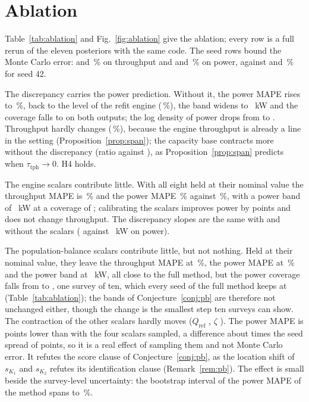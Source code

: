 \documentclass[journal]{IEEEtran}
\newcommand{\pct}{\,\%}
\begin{document}
\section{Ablation}\label{sec:ablation}

Table~\ref{tab:ablation} and Fig.~\ref{fig:ablation} give the ablation; every row is a full rerun of the eleven posteriors with
the same code. The seed rows bound the Monte Carlo error: \abSeedBTphMape{} and \abSeedCTphMape\pct{} on throughput and
\abSeedBKwMape{} and \abSeedCKwMape\pct{} on power, against \abFullTphMape{} and \abFullKwMape\pct{} for seed 42.

The discrepancy carries the power prediction. Without it, the power MAPE rises to \abNoDiscKwMape\pct{}, back to the level of
the refit engine (\backKwMapeBoot\pct), the band widens to \abNoDiscKwWidth~kW and the coverage falls to \abNoDiscKwCov{} on
both outputs; the log density of power drops from \abFullKwLpd{} to \abNoDiscKwLpd. Throughput hardly changes
(\abNoDiscTphMape\pct), because the engine throughput is already a line in the setting (Proposition~\ref{prop:span}); the
capacity base contracts more without the discrepancy (ratio \abNoDiscQRefContr{} against \abFullQRefContr), as
Proposition~\ref{prop:span} predicts when $\tau_{\mathrm{tph}}\to0$. H4 holds.

The engine scalars contribute little. With all eight held at their nominal value the throughput MAPE is \abEngFixTphMape\pct{}
and the power MAPE \abEngFixKwMape\pct{} against \abFullKwMape\pct{}, with a power band of \abEngFixKwWidth~kW
at a coverage of \abEngFixKwCov; calibrating the scalars improves power by \engFixGainKw{} points and does not change
throughput. The discrepancy slopes are the same with and without the scalars (\abEngFixDKwCssMean{} against
\abFullDKwCssMean~kW on power).

The population-balance scalars contribute little, but not nothing. Held at their nominal value, they leave the throughput
MAPE at \abBalFixTphMape\pct, the power MAPE at \abBalFixKwMape\pct{} and the power band at \abBalFixKwWidth~kW, all close to
the full method, but the power coverage falls from \abFullKwCov{} to \abBalFixKwCov{}, one survey of ten, which every seed of
the full method keeps at \abFullKwCov{} (Table~\ref{tab:ablation}); the bands of Conjecture~\ref{conj:pb} are therefore not
unchanged either, though the change is the smallest step ten surveys can show. The contraction of the other scalars hardly moves ($Q_{\mathrm{ref}}$ \abBalFixQRefContr, $\zeta$
\abBalFixZetaContr). The power MAPE is \balFixGainKw{} points lower than with the four scalars sampled, a difference about
\balFixOverSeed{} times the seed spread of \seedSpreadKw{} points, so it is a real effect of sampling them and not Monte Carlo error.
It refutes the score clause of Conjecture~\ref{conj:pb}, as the location shift of $s_{K_1}$ and $s_{K_2}$ refutes its
identification clause (Remark~\ref{rem:pb}). The effect is small beside the survey-level uncertainty: the bootstrap
interval of the power MAPE of the method spans \cbKwMapeLo{} to \cbKwMapeHi\pct.
\end{document}
